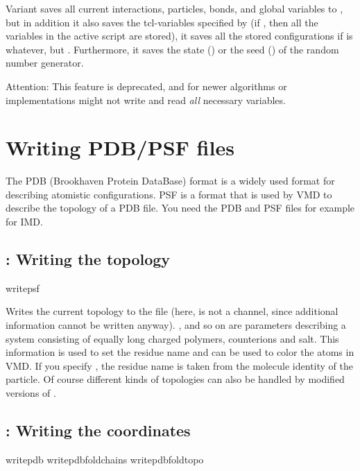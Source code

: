 Variant  saves all current interactions, particles, bonds,
and global variables to , but in addition it also
saves the tcl-variables specified by  (if , then
all the variables in the active script are stored), it saves all the
stored configurations if  is whatever, but \lit{-}.
Furthermore, it saves the state () or the seed ()
of the random number generator.

Attention: This feature is deprecated, and for newer algorithms or
implementations might not write and read \emph{all} necessary
variables.

\section{Writing PDB/PSF files}
The PDB (Brookhaven Protein DataBase) format is a widely used format
for describing atomistic configurations. PSF is a format that is used
by VMD to describe the topology of a PDB file. You need the PDB and
PSF files for example for IMD.

\subsection{: Writing the topology}

\begin{essyntax}
  writepsf     
   
\end{essyntax}
Writes the current topology to the file  (here, 
is not a channel, since additional information cannot be written
anyway).  ,  and so on are parameters describing a
system consisting of equally long charged polymers, counterions and
salt.  This information is used to set the residue name and can be
used to color the atoms in VMD. If you specify , the
residue name is taken from the molecule identity of the particle. Of
course different kinds of topologies can also be handled by modified
versions of .


\subsection{: Writing the coordinates}

\begin{essyntax}
   writepdb 
   writepdbfoldchains  
    
   writepdbfoldtopo  
\end{essyntax}

